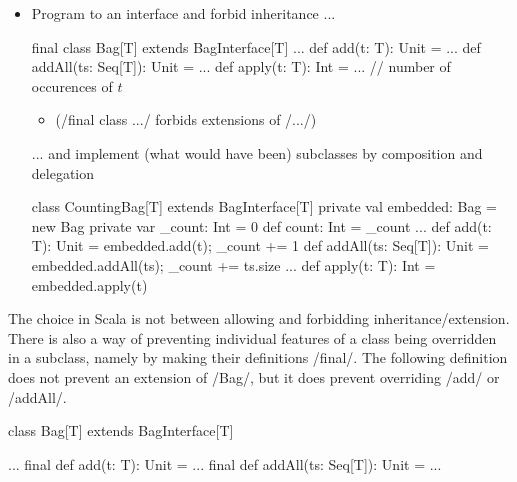 \documentclass{ip3}
\begin{document}
\begin{foil}
\begin{itemize}
        \item Program to an interface and forbid inheritance ...
        \begin{-scala}
        
           final class Bag[T] extends BagInterface[T] {
             ...
             def add(t: T): Unit          = ...
             def addAll(ts: Seq[T]): Unit = ...
             def apply(t: T): Int         = ...       // number of occurences of $t$
           }
        \end{-scala}
       \begin{itemize}
                \item[] (\sc/final class .../ forbids extensions of \sc/.../)
        \end{itemize}
         
        \vitem ... and implement (what would have been) subclasses by composition and delegation  
        \begin{-scala}

           class CountingBag[T] extends BagInterface[T] {
             private val embedded: Bag = new Bag
             private var _count: Int = 0
                     def count:  Int = _count
             ...
             def add(t: T): Unit          = { embedded.add(t);     _count += 1 }
             def addAll(ts: Seq[T]): Unit = { embedded.addAll(ts); _count += ts.size } 
             ...
             def apply(t: T): Int         = embedded.apply(t)      
           }
        \end{-scala} 
\end{itemize}
\begin{note}
The choice in Scala is not between allowing and forbidding inheritance/extension.
There is also a way of preventing individual features of a class being overridden in a subclass,
namely by making their definitions \sc/final/. The following definition does not
prevent an extension of \sc/Bag/, but it does prevent overriding  \sc/add/ or \sc/addAll/.
        \begin{-scala}
        
           class Bag[T] extends BagInterface[T] {
             ...
             final def add(t: T): Unit          = ...
             final def addAll(ts: Seq[T]): Unit = ...
             
}
\end{-scala}
\end{note}
\end{foil}
\end{document}
